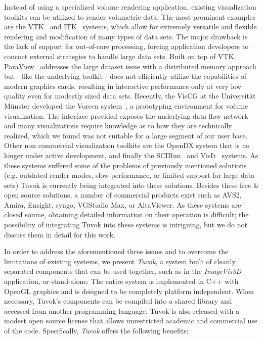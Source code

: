 Instead of using a specialized volume rendering application,
existing visualization toolkits can be utilized to render
volumetric data. The most prominent examples are the
VTK~\cite{Schroeder:2006:VTK} and ITK~\cite{Yoo:2002:ITK} systems,
which allow for extremely versatile and flexible rendering and
modification of many types of data sets. The major drawback is the lack
of support for out-of-core processing, forcing application developers
to concoct external strategies to handle
large data sets. Built on top of VTK,
ParaView~\cite{Ahrens:2005:ParaView} addresses the large dataset
issue with a distributed memory approach but---like the underlying
toolkit---does not efficiently utilize the capabilities of modern
graphics cards, resulting in interactive performance only at very low
quality even for modestly sized data sets. Recently, the VisCG at the
Universit\"at M\"unster developed the Voreen
system~\cite{Voreen:2009}, a prototyping environment for volume
visualization.  The interface provided exposes the underlying data
flow network and many visualizations require knowledge as to how they
are technically realized, which we found was not suitable for a large
segment of our user base. Other non commercial visualization toolkits
are the OpenDX system that is no longer under active development, and
finally the SCIRun~\cite{Macleod:2004:SCIRun} and
VisIt~\cite{Childs:2005:Contracts, Childs:2012:VisIt} systems. As these
systems suffered some of the problems of previously mentioned solutions
(e.g. outdated render modes, slow performance, or limited support
for large data sets) Tuvok is currently being integrated into these
solutions. Besides these free \& open source solutions, a number of
commercial products exist such as AVS2, Amira, Ensight, syngo, VGStudio
Max, or AltaViewer. As these systems are closed source, obtaining
detailed information on their operation is difficult; the possibility
of integrating Tuvok into these systems is intriguing, but we do not
discuss them in detail for this work.

In order to address the aforementioned three issues and to overcome the
limitations of existing systems, we present \textit{Tuvok}, a system
built of cleanly separated components that can
be used together, such as in the \textit{ImageVis3D} application,
or stand-alone. The entire system is implemented in C++ with OpenGL
graphics and is designed to be completely platform independent. When
necessary, Tuvok's components can be compiled into a shared library
and accessed from another programming language. Tuvok is also released
with a modest open source license that allows unrestricted academic and
commercial use of the code. Specifically,
\textit{Tuvok} offers the following benefits:

